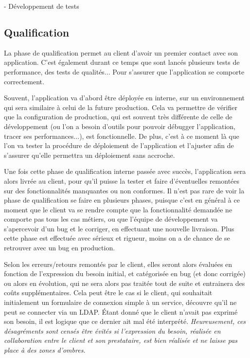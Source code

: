 - Développement de tests


\subsection{Qualification}

La phase de qualification permet au client d'avoir un premier contact avec son application. C'est également durant ce temps que sont lancés plusieurs tests de performance, des tests de qualités... Pour s'assurer que l'application se comporte correctement.

Souvent, l'application va d'abord être déployée en interne, sur un environnement qui sera similaire à celui de la future production. Cela va permettre de vérifier que la configuration de production, qui est souvent très différente de celle de développement (ou l'on a besoin d'outils pour pouvoir débugger l'application, tracer ses performances...), est fonctionnelle. De plus, c'est à ce moment là que l'on va tester la procédure de déploiement de l'application et l'ajuster afin de s'assurer qu'elle permettra un déploiement sans accroche.

Une fois cette phase de qualification interne passée avec succès, l'application sera alors livrée au client, pour qu'il puisse la tester et faire d'éventuelles remontées sur des fonctionnalités manquantes ou non conformes. Il n'est pas rare de voir la phase de qualification se faire en plusieurs phases, puisque c'est en général à ce moment que le client va se rendre compte que la fonctionnalité demandée ne comporte pas tous les cas métiers, ou que l'équipe de développement va s'apercevoir d'un bug et le corriger, en effectuant une nouvelle livraison. Plus cette phase est effectuée avec sérieux et rigueur, moins on a de chance de se retrouver avec un bug en production. 

Selon les erreurs/retours remontés par le client, elles seront alors évaluées en fonction de l'expression du besoin initial, et catégorisée en bug (et donc corrigée) ou alors en évolution, qui ne sera alors pas traitée tout de suite et entrainera des coûts supplémentaires. Cela peut être le cas si le client, qui souhaitait initialement un formulaire de connexion simple à un service, découvre qu'il ne peut se connecter via un \gls{LDAP}. Étant donné que le client n'avait pas exprimé son besoin, il est logique que ce dernier ait mal été interprété. \emph{Heureusement, ces désagréments sont censés être évités si l'expression du besoin, réalisée en collaboration entre le client et son prestataire, est bien réalisée et ne laisse pas place à des zones d'ombres.}

